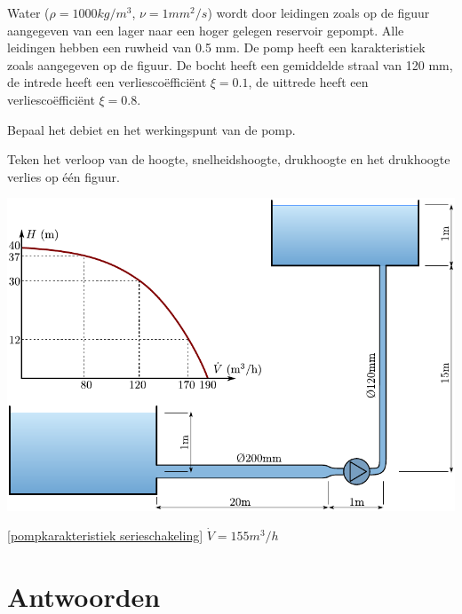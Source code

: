 \begin{toepassing}[*]
	\label{pompkarakteristiek serieschakeling}
Water ($\rho=1000\unit{kg/m^3}$, $\nu=1\unit{mm^2/s}$) wordt door leidingen zoals op de figuur aangegeven van een lager naar een hoger gelegen reservoir gepompt. Alle leidingen hebben een ruwheid van 0.5 mm. De pomp heeft een karakteristiek zoals aangegeven op de figuur. De bocht heeft een gemiddelde straal van 120 mm, de intrede heeft een verliescoëfficiënt $\xi = 0.1$, de uittrede heeft een verliescoëfficiënt $\xi = 0.8$.
		
Bepaal het debiet en het werkingspunt van de pomp.
		
Teken het verloop van de hoogte, snelheidshoogte, drukhoogte en het drukhoogte verlies op één figuur.

	\centering
	\includegraphics{fig/stroming_in_leidingen/pompopvoerhoogte}
\end{toepassing}
\begin{antwoord}{\ref{pompkarakteristiek serieschakeling}}
	$\dot{V} = 155\unit{m^3/h}$
\end{antwoord}
\section*{Antwoorden}
	\begin{multicols}{2}
	\end{multicols}